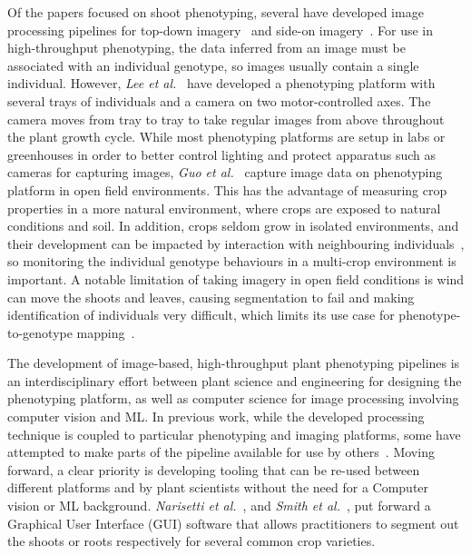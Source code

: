 Of the papers focused on shoot phenotyping, several have developed image processing pipelines for top-down imagery~\cite{fanSegmentationGuidedDeepLearning2022, guoIlluminationInvariantSegmentation2013, ronnebergerUNetConvolutionalNetworks2015, hutherARADEEPOPSISAutomatedWorkflow2020, leeAutomatedHighthroughputPlant2018, narisettiDeepLearningBased2022} and side-on imagery~\cite{daschoudhuryHolisticComponentPlant2018, narisettiDeepLearningBased2022}. 
For use in high-throughput phenotyping, the data inferred from an image must be associated with an individual genotype, so images usually contain a single individual.
However, \textit{Lee et al.}~\cite{leeAutomatedHighthroughputPlant2018} have developed a phenotyping platform with several trays of individuals and a camera on two motor-controlled axes.
The camera moves from tray to tray to take regular images from above throughout the plant growth cycle.
While most phenotyping platforms are setup in labs or greenhouses in order to better control lighting and protect apparatus such as cameras for capturing images, \textit{Guo et al.}~\cite{guoIlluminationInvariantSegmentation2013, guoEasyPCCBenchmarkDatasets2017} capture image data on phenotyping platform in open field environments.
This has the advantage of measuring crop properties in a more natural environment, where crops are exposed to natural conditions and soil.
In addition, crops seldom grow in isolated environments, and their development can be impacted by interaction with neighbouring individuals~\cite{finchWheatRootLength2017}, so monitoring the individual genotype behaviours in a multi-crop environment is important.
A notable limitation of taking imagery in open field conditions is wind can move the shoots and leaves, causing segmentation to fail and making identification of individuals very difficult, which limits its use case for phenotype-to-genotype mapping~\cite{guoEasyPCCBenchmarkDatasets2017}.

The development of image-based, high-throughput plant phenotyping pipelines is an interdisciplinary effort between plant science and engineering for designing the phenotyping platform, as well as computer science for image processing involving computer vision and ML.
In previous work, while the developed processing technique is coupled to particular phenotyping and imaging platforms, some have attempted to make parts of the pipeline available for use by others~\cite{hutherARADEEPOPSISAutomatedWorkflow2020, henkeSemiAutomatedGroundTruth2021, guoEasyPCCBenchmarkDatasets2017, narisettiDeepLearningBased2022}.
Moving forward, a clear priority is developing tooling that can be re-used between different platforms and by plant scientists without the need for a Computer vision or ML background.
\textit{Narisetti et al.}~\cite{narisettiDeepLearningBased2022}, and \textit{Smith et al.}~\cite{smithSegmentationRootsSoil2020}, put forward a Graphical User Interface (GUI) software that allows practitioners to segment out the shoots or roots respectively for several common crop varieties.

